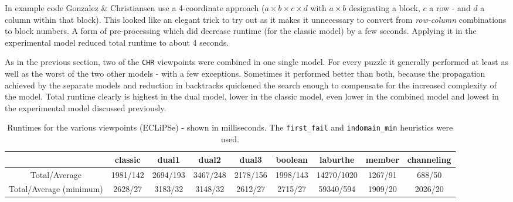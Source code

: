 In example code Gonzalez \& Christiansen use a 4-coordinate approach ($a\times b\times c\times d$ with $a\times b$ designating a block, $c$ a row - and $d$ a column within that block). This looked like an elegant trick to try out as it makes it unnecessary to convert from \textit{row-column} combinations to block numbers. A form of pre-processing which did decrease runtime (for the classic model) by a few seconds. Applying it in the experimental model reduced total runtime to about 4 seconds.\\\par

As in the previous section, two of the \texttt{CHR} viewpoints were combined in one single model. For every puzzle it generally performed at least as well as the worst of the two other models - with a few exceptions. Sometimes it performed better than both, because the propagation achieved by the separate models and reduction in backtracks quickened the search enough to compensate for the increased complexity of the model. Total runtime clearly is highest in the dual model, lower in the classic model, even lower in the combined model and lowest in the experimental model discussed previously.

\begin{table}[h]
\footnotesize
\bgroup
\def\arraystretch{1.3}
\begin{tabular}{ccccccccc}
\multicolumn{1}{l}{} & classic & dual1 & dual2 & dual3 & boolean & laburthe & member & channeling \\ \hline
Total/Average & 1981/142 & 2694/193 & 3467/248 & 2178/156 & 1998/143 & 14270/1020 & 1267/91 & 688/50 \\
Total/Average (minimum) & 2628/27 & 3183/32 & 3148/32 & 2612/27 & 2715/27 & 59340/594 & 1909/20 & 2026/20
\end{tabular}
\egroup
\caption{Runtimes for the various viewpoints (ECLiPSe) - shown in milliseconds. The \texttt{first\_fail} and \texttt{indomain\_min} heuristics were used.}
\label{tab:res1}
\end{table}

